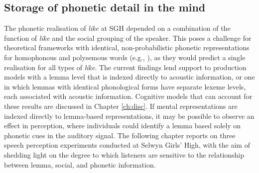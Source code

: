 \subsection{Storage of phonetic detail in the mind}




The phonetic realisation of \textit{like} at SGH depended on a combination of the function of \textit{like} and the social grouping of the speaker.  This poses a challenge for theoretical frameworks with identical, non-probabilistic phonetic representations for homophonous and polysemous words (e.g., ), as they would predict a single realisation for all types of \textit{like}.  The current findings lend support to production models with a lemma level that is indexed directly to acoustic information, or one in which lemmas with identical phonological forms have separate lexeme levels, each associated with acoustic information.  Cognitive models that can account for these results are discussed in Chapter \ref{ch:disc}.  If mental representations are indexed directly to lemma-based representations, it may be possible to observe an effect in perception, where individuals could identify a lemma based solely on phonetic cues in the auditory signal.  The following chapter reports on three speech perception experiments conducted at Selwyn Girls' High, with the aim of shedding light on the degree to which listeners are sensitive to the relationship between lemma, social, and phonetic information.













